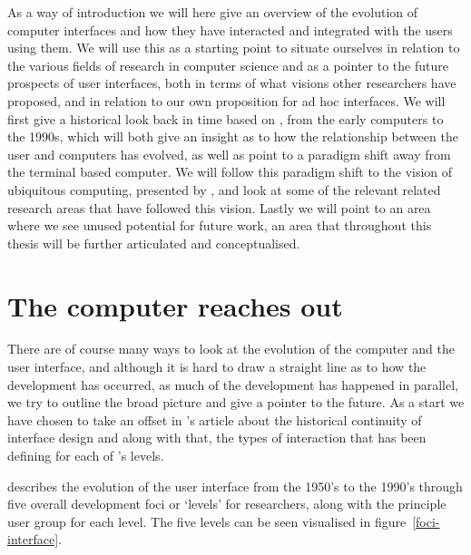 As a way of introduction we will here give an overview of the evolution of computer interfaces and how they have interacted and integrated with the users using them.
We will use this as a starting point to situate ourselves in relation to the various fields of research in computer science and as a pointer to the future prospects of user interfaces, both in terms of what visions other researchers have proposed, and in relation to our own proposition for ad hoc interfaces.
We will first give a historical look back in time based on \citet{grudin1990computer}, from the early computers to the 1990s, which will both give an insight as to how the relationship between the user and computers has evolved, as well as point to a paradigm shift away from the terminal based computer.
We will follow this paradigm shift to the vision of ubiquitous computing, presented by \citet{weiser1991computer}, and look at some of the relevant related research areas that have followed this vision.
Lastly we will point to an area where we see unused potential for future work, an area that throughout this thesis will be further articulated and conceptualised.   

\section{The computer reaches out}
There are of course many ways to look at the evolution of the computer and the user interface, and although it is hard to draw a straight line as to how the development has occurred, as much of the development has happened in parallel, we try to outline the broad picture and give a pointer to the future.
As a start we have chosen to take an offset in \citeauthor{grudin1990computer}'s article about the historical continuity of interface design \citep{grudin1990computer} and along with that, the types of interaction that has been defining for each of \citeauthor{grudin1990computer}'s levels.

\citeauthor{grudin1990computer} describes the evolution of the user interface from the 1950's to the 1990's through five overall development foci or `levels' for researchers, along with the principle user group for each level.
The five levels can be seen visualised in figure~\ref{foci-interface}.

